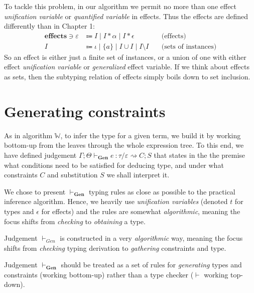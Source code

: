 \documentclass[declaration,shortabstract]{iithesis}
\theoremstyle{definition} \newtheorem{definition}{Definition}[section]
\newcommand{\gens}[6][\Gamma;\Theta]{\ensuremath{{{#1} \vdash_\textbf{Gen} {#2} \: : {#3}/{#4}} \rightsquigarrow {#5};{#6}}}
\begin{document}
To tackle this problem, in our algorithm we permit no more than one effect
\textit{unification variable} or \textit{quantified variable} in effects.
Thus the effects are defined differently than in Chapter 1:
\begin{align*} 
    \textbf{effects} \ni \varepsilon & \Coloneqq
    I \mid 
    I * \alpha \mid 
    I * \epsilon  &  \text{(effects)}
\\
    I & \Coloneqq \iota \mid \{a\} \mid I \cup I \mid I \setminus I
    \quad & \text{(sets of instances)}
\end{align*}
So an effect is either just a finite set of instances, or a union of one with either effect \textit{unification variable} or \textit{generalized} effect variable.
If we think about effects as sets,
then the subtyping relation of effects simply boils down to set inclusion.

\section{Generating constraints}
As in algorithm $\mathbb{W}$, to infer the type for a given term,
we build it by working bottom-up from the leaves through the whole expression tree.
To this end, we have defined judgement $\gens{e}{\tau}{\varepsilon}{C}{S}$ that
states in the the premise what conditions need to be satisfied for deducing type, 
and under what constraints $C$ and substitution $S$ we shall interpret it.

We chose to present  $\vdash_\textbf{Gen}$ typing rules as close as possible
to the practical inference algorithm.
Hence, we heavily use \textit{unification variables}
(denoted $t$ for types and $\epsilon$ for effects) 
and the rules are somewhat \textit{algorithmic}, meaning the focus shifts from \textit{checking} to \textit{obtaining} a type.

Judgement $\vdash_{Gen}$ is constructed in a very \textit{algorithmic} way, meaning the focus shifts from \textit{checking} typing derivation to \textit{gathering} constraints and type.

Judgement  $\vdash_\textbf{Gen}$ should be treated as a set of rules for
\textit{generating} types and constraints (working bottom-up) rather than
a type checker ($\vdash$ working top-down).
\end{document}

